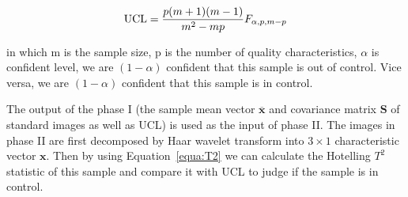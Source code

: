 \begin{equation}
\centering \mathrm{UCL}=\frac{p(m+1)(m-1)}{m^{2}-m p} F_{\alpha, p, m-p}
\label{equa:UCL}
\end{equation}

in which m is the sample size, p is the number of quality characteristics, $\alpha$ is confident level,
we are $(1 - \alpha)$ confident that this sample is out of control. Vice versa, we are $(1- \alpha)$ confident that this sample is in control.


The output of the phase I (the sample mean vector $\overline{\mathbf{x}}$ and covariance matrix $\mathbf{S}$ of standard images as well as UCL) is used as the input of phase II. The images in phase II are first decomposed by Haar wavelet transform into $3 \times 1$ characteristic vector $\mathbf{x}$. Then by using Equation~\ref{equa:T2} we can calculate the Hotelling $T^{2}$ statistic of this sample and compare it with UCL to judge if the sample is in control.








